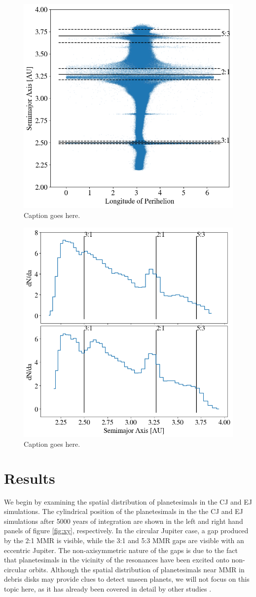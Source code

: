 \documentclass[onecolumn]{aastex63}
\begin{document}
\begin{figure}
    \begin{center}
    \includegraphics[width=0.4\columnwidth]{figures/long_ph.png}
    \caption{Caption goes here.\label{fig:long_ph}}
    \end{center}
\end{figure}

\begin{figure}
    \begin{center}
    \includegraphics[width=0.4\columnwidth]{figures/coll_hist_a.png}
    \caption{Caption goes here.\label{fig:coll_hist_a}}
    \end{center}
\end{figure}

\section{Results} \label{sec:results}

We begin by examining the spatial distribution of planetesimals in the CJ and EJ simulations. The cylindrical position of the planetesimals 
in the the CJ and EJ simulations after 5000 years of integration are shown in the left and right hand panels of  figure \ref{fig:xy}, 
respectively. In the circular Jupiter case, a gap produced by the 2:1 MMR is visible, while the 3:1 and 5:3 MMR gaps are visible with an 
eccentric Jupiter. The non-axisymmetric nature of the gaps is due to the fact that planetesimals in the vicinity of the resonances have been 
excited onto non-circular orbits. Although the spatial distribution of planetesimals near MMR in debris disks may provide clues to detect 
unseen planets, we will not focus on this topic here, as it has already been covered in detail by other studies \citep{2016ApJ...818..159T, 
2018ApJ...857....3T}.
\end{document}

